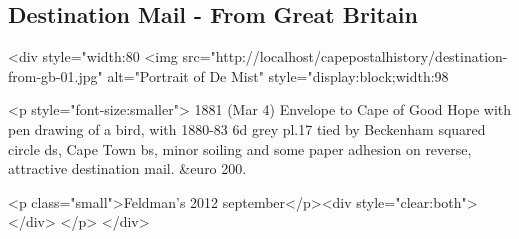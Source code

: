 \subsection{Destination Mail - From Great Britain
} 
<div style="width:80%
<img src="http://localhost/capepostalhistory/destination-from-gb-01.jpg" 
alt="Portrait of De Mist" style="display:block;width:98%

<p style="font-size:smaller"> 
1881 (Mar 4) Envelope to Cape of Good Hope with pen drawing of a bird, with 1880-83 6d grey pl.17 tied by Beckenham squared circle ds, Cape Town bs, minor soiling and some paper adhesion on reverse, attractive destination mail. &euro 200.

<p class="small">Feldman's 2012 september</p><div style="clear:both"></div>
</p>
</div>




	 
                            